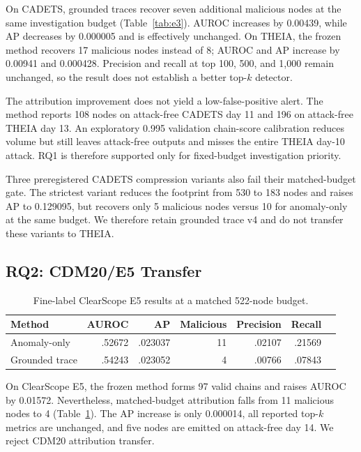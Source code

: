 \documentclass[runningheads]{llncs}
\begin{document}
On CADETS, grounded traces recover seven additional malicious nodes at the same investigation budget (Table~\ref{tab:e3}). AUROC increases by 0.00439, while AP decreases by 0.000005 and is effectively unchanged. On THEIA, the frozen method recovers 17 malicious nodes instead of 8; AUROC and AP increase by 0.00941 and 0.000428. Precision and recall at top 100, 500, and 1,000 remain unchanged, so the result does not establish a better top-$k$ detector.

The attribution improvement does not yield a low-false-positive alert. The method reports 108 nodes on attack-free CADETS day 11 and 196 on attack-free THEIA day 13. An exploratory 0.995 validation chain-score calibration reduces volume but still leaves attack-free outputs and misses the entire THEIA day-10 attack. RQ1 is therefore supported only for fixed-budget investigation priority.

Three preregistered CADETS compression variants also fail their matched-budget gate. The strictest variant reduces the footprint from 530 to 183 nodes and raises AP to 0.129095, but recovers only 5 malicious nodes versus 10 for anomaly-only at the same budget. We therefore retain grounded trace v4 and do not transfer these variants to THEIA.

\subsection{RQ2: CDM20/E5 Transfer}

\begin{table}[t]
\caption{Fine-label ClearScope E5 results at a matched 522-node budget.}
\label{tab:e5}
\centering
\small
\setlength{\tabcolsep}{4.3pt}
\begin{tabular}{lrrrrrr}
\toprule
Method & AUROC & AP & Malicious & Precision & Recall \\
\midrule
Anomaly-only & .52672 & .023037 & 11 & .02107 & .21569 \\
Grounded trace & .54243 & .023052 & 4 & .00766 & .07843 \\
\bottomrule
\end{tabular}
\end{table}

On ClearScope E5, the frozen method forms 97 valid chains and raises AUROC by 0.01572. Nevertheless, matched-budget attribution falls from 11 malicious nodes to 4 (Table~\ref{tab:e5}). The AP increase is only 0.000014, all reported top-$k$ metrics are unchanged, and five nodes are emitted on attack-free day 14. We reject CDM20 attribution transfer.
\end{document}
